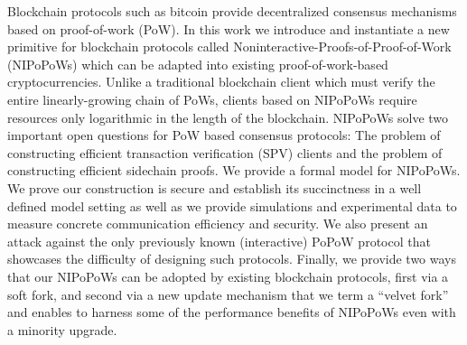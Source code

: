 Blockchain protocols such as bitcoin provide decentralized consensus mechanisms
based on proof-of-work (PoW). In this work we introduce and instantiate a new
primitive for blockchain protocols called Noninteractive-Proofs-of-Proof-of-Work
(NIPoPoWs) which can be adapted into existing proof-of-work-based
cryptocurrencies. Unlike a traditional blockchain client which must verify the
entire linearly-growing chain of PoWs, clients based on NIPoPoWs require
resources only logarithmic in the length of the blockchain. NIPoPoWs solve two
important open questions for PoW based consensus protocols: The problem of
constructing efficient transaction verification (SPV) clients and the problem
of constructing efficient sidechain proofs. We provide a formal model for
NIPoPoWs. We prove our construction is secure  and establish its succinctness in a well defined model setting as well as 
 we provide simulations and
experimental data to measure concrete communication efficiency and security.
We also  present an attack against the only 
previously known (interactive) PoPoW protocol 
that showcases the difficulty of designing such protocols. 
Finally, we provide two ways that our NIPoPoWs can be adopted by existing
blockchain protocols, first via a soft fork, and second via a new update
mechanism that we term a ``velvet fork'' and enables to harness some of the
performance benefits of NIPoPoWs even with a minority upgrade.

